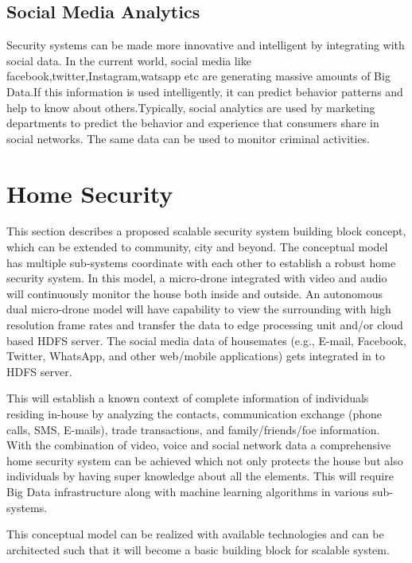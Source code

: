 \documentclass[sigconf]{acmart}
\begin{document}
\subsection{Social Media Analytics}
Security systems can be made more innovative and intelligent by integrating with social data. In the current world, social media like facebook,twitter,Instagram,watsapp etc are generating massive amounts of Big Data.If this information is used intelligently, it can predict behavior patterns and help to know about others.Typically, social analytics are used by marketing departments to predict the behavior and experience that consumers share in social networks. The same data can be used to monitor criminal activities.

\section{Home Security}
This section describes a proposed scalable security system building block concept, which can be extended to community, city and beyond.  The conceptual model has multiple sub-systems coordinate with each other to establish a robust home security system. In this model, a micro-drone integrated with video and audio will continuously monitor the house both inside and outside. An autonomous dual micro-drone model will have capability to view the surrounding with high resolution frame rates and transfer the data to edge processing unit and/or cloud based HDFS server. The social media data of housemates (e.g., E-mail, Facebook, Twitter, WhatsApp, and other web/mobile applications) gets integrated in to HDFS server.

This will establish a known context of complete information of individuals residing in-house by analyzing the contacts, communication exchange (phone calls, SMS, E-mails), trade transactions, and family/friends/foe information. With the combination of video, voice and social network data a comprehensive home security system can be achieved which not only protects the house but also individuals by having super knowledge about all the elements. This will require Big Data infrastructure along with machine learning algorithms in various sub-systems.

This conceptual model can be realized with available technologies and can be architected such that it will become a basic building block for scalable system.
\end{document}
